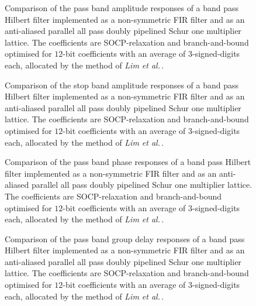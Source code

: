\documentclass[a4paper,twoside,10pt,english]{article}
\newcommand{\DesignOfSchurLatticeFiltersPdfScale}{1}
\begin{document}
\begin{figure}
\centering
\scalebox{\DesignOfSchurLatticeFiltersPdfScale}{}
\caption{Comparison of the pass band amplitude responses of a
  band pass Hilbert filter implemented as a non-symmetric FIR filter and as an
  anti-aliased parallel all pass doubly pipelined Schur one multiplier lattice.
  The coefficients are SOCP-relaxation and branch-and-bound
  optimised for $12$-bit coefficients with an average of $3$-signed-digits each,
  allocated by the method of \emph{Lim et al.}\,.}
\label{fig:Comp-schurOneMPAlattice-doubly-pipelined-bandpass-hilbert-12-nbits-Schur-FIR-pass}
\end{figure}

\begin{figure}
\centering
\scalebox{\DesignOfSchurLatticeFiltersPdfScale}{}
\caption{Comparison of the stop band amplitude responses of a
  band pass Hilbert filter implemented as a non-symmetric FIR filter and as an
  anti-aliased parallel all pass doubly pipelined Schur one multiplier lattice.
  The coefficients are SOCP-relaxation and branch-and-bound
  optimised for $12$-bit coefficients with an average of $3$-signed-digits each,
  allocated by the method of \emph{Lim et al.}\,.}
\label{fig:Comp-schurOneMPAlattice-doubly-pipelined-bandpass-hilbert-12-nbits-Schur-FIR-stop}
\end{figure}

\begin{figure}
\centering
\scalebox{\DesignOfSchurLatticeFiltersPdfScale}{}
\caption{Comparison of the pass band phase responses of a
  band pass Hilbert filter implemented as a non-symmetric FIR filter and as an
  anti-aliased parallel all pass doubly pipelined Schur one multiplier lattice.
  The coefficients are SOCP-relaxation and branch-and-bound
  optimised for $12$-bit coefficients with an average of $3$-signed-digits each,
  allocated by the method of \emph{Lim et al.}\,.}
\label{fig:Comp-schurOneMPAlattice-doubly-pipelined-bandpass-hilbert-12-nbits-Schur-FIR-phase}
\end{figure}

\begin{figure}
\centering
\scalebox{\DesignOfSchurLatticeFiltersPdfScale}{}
\caption{Comparison of the pass band group delay responses of a
  band pass Hilbert filter implemented as a non-symmetric FIR filter and as an
  anti-aliased parallel all pass doubly pipelined Schur one multiplier lattice.
  The coefficients are SOCP-relaxation and branch-and-bound
  optimised for $12$-bit coefficients with an average of $3$-signed-digits each,
  allocated by the method of \emph{Lim et al.}\,.}
\label{fig:Comp-schurOneMPAlattice-doubly-pipelined-bandpass-hilbert-12-nbits-Schur-FIR-delay}
\end{figure}

\clearpage



\end{document}
